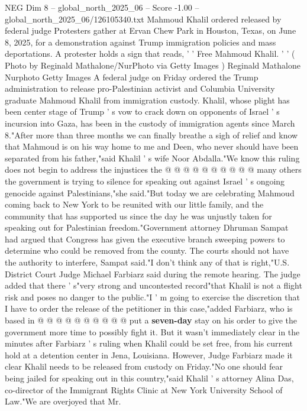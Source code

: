 \begin{textsample}{NEG Dim 8 – global\_north\_2025\_06 – Score -1.00 – global\_north\_2025\_06/126105340.txt}  \label{ex:f8_neg_398}
Mahmoud Khalil ordered released by federal judge Protesters gather at Ervan Chew Park in Houston, Texas, on June 8, 2025, for a demonstration against Trump immigration policies and mass deportations.
A protester holds a sign that reads, ' ' Free Mahmoud Khalil. ' ' ( Photo by Reginald Mathalone/NurPhoto via Getty Images ) Reginald Mathalone Nurphoto Getty Images A federal judge on Friday ordered the Trump administration to release pro-Palestinian activist and Columbia University graduate Mahmoud Khalil from immigration custody.
Khalil, whose plight has been center stage of Trump ' s vow to crack down on opponents of Israel ' s incursion into Gaza, has been in the custody of immigration agents since March 8."After more than three months we can finally breathe a sigh of relief and know that Mahmoud is on his way home to me and Deen, who never should have been separated from his father,"said Khalil ' s wife Noor Abdalla."We know this ruling does not begin to address the injustices the @ @ @ @ @ @ @ @ @ @ many others the government is trying to silence for speaking out against Israel ' s ongoing genocide against Palestinians,"she said."But today we are celebrating Mahmoud coming back to New York to be reunited with our little family, and the community that has supported us since the day he was unjustly taken for speaking out for Palestinian freedom."Government attorney Dhruman Sampat had argued that Congress has given the executive branch sweeping powers to determine who could be removed from the county.
The courts should not have the authority to interfere, Sampat said."I don't think any of that is right,"U.S.
District Court Judge Michael Farbiarz said during the remote hearing.
The judge added that there ' s"very strong and uncontested record"that Khalil is not a flight risk and poses no danger to the public."I ' m going to exercise the discretion that I have to order the release of the petitioner in this case,"added Farbiarz, who is based in @ @ @ @ @ @ @ @ @ @ put a \textbf{seven-day} stay on his order to give the government more time to possibly fight it.
But it wasn't immediately clear in the minutes after Farbiarz ' s ruling when Khalil could be set free, from his current hold at a detention center in Jena, Louisiana.
However, Judge Farbiarz made it clear Khalil needs to be released from custody on Friday."No one should fear being jailed for speaking out in this country,"said Khalil ' s attorney Alina Das, co-director of the Immigrant Rights Clinic at New York University School of Law."We are overjoyed that Mr.

\end{textsample}
